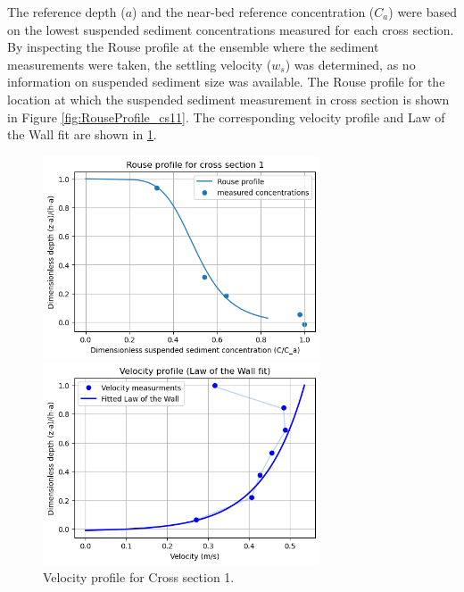The reference depth ($a$) and the near-bed reference concentration ($C_a$) were based on the lowest suspended sediment concentrations measured for each cross section. By inspecting the Rouse profile at the ensemble where the sediment measurements were taken, the settling velocity ($w_s$) was determined, as no information on suspended sediment size was available. The Rouse profile for the location at which the suspended sediment measurement in cross section is shown in Figure \ref{fig:RouseProfile_cs11}. The corresponding velocity profile and Law of the Wall fit are shown in \ref{fig:VelProfile_cs11}.

\begin{figure}[H]
    \centering
    \begin{minipage}[b]{0.48\linewidth}
        \centering
        \includegraphics[height=6cm]{figures/ch6/RouseProfile_cs11.png}
        \caption{Rouse profile for Cross section 1.}
        \label{fig:RouseProfile_cs11}
    \end{minipage}
    \hfill
    \begin{minipage}[b]{0.48\linewidth}
        \centering
        \includegraphics[height=6cm]{figures/ch6/Vel_profile_cs11.png}
        \caption{Velocity profile for Cross section 1.}
        \label{fig:VelProfile_cs11}
    \end{minipage}
\end{figure}

